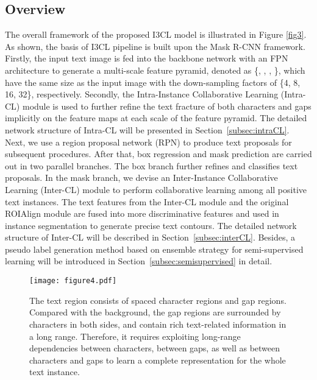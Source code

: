 \subsection{Overview}
The overall framework of the proposed I3CL model is illustrated in Figure \ref{fig3}. As shown, the basis of I3CL pipeline is built upon the Mask R-CNN framework. Firstly, the input text image is fed into the backbone network with an FPN \citep{fpn} architecture to generate a multi-scale feature pyramid, denoted as \{, , , \}, which have the same size as the input image with the down-sampling factors of \{4, 8, 16, 32\}, respectively. Secondly, the Intra-Instance Collaborative Learning (Intra-CL) module is used to further refine the text fracture of both characters and gaps implicitly on the feature maps at each scale of the feature pyramid. The detailed network structure of Intra-CL will be presented in Section~\ref{subsec:intraCL}. Next, we use a region proposal network (RPN) to produce text proposals for subsequent procedures. After that, box regression and mask prediction are carried out in two parallel branches. The box branch further refines and classifies text proposals. In the mask branch, we devise an Inter-Instance Collaborative Learning (Inter-CL) module to perform collaborative learning among all positive text instances. The text features from the Inter-CL module and the original ROIAlign module are fused into more discriminative features and used in instance segmentation to generate precise text contours. The detailed network structure of Inter-CL will be described in Section~\ref{subsec:interCL}. Besides, a pseudo label generation method based on ensemble strategy for semi-supervised learning will be introduced in Section~\ref{subsec:semisupervised} in detail. 

\begin{figure}[t]
  \centering
  \texttt{[image: figure4.pdf]}
  \caption{The text region consists of spaced character regions and gap regions. Compared with the background, the gap regions are surrounded by characters in both sides, and contain rich text-related information in a long range. Therefore, it requires exploiting long-range dependencies between characters, between gaps, as well as between characters and gaps to learn a complete representation for the whole text instance. }
  \label{fig4}
\end{figure}


